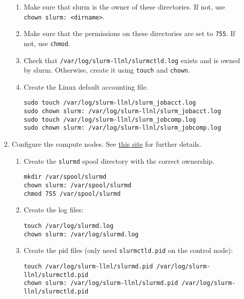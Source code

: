 \begin{enumerate}
\begin{enumerate}
\begin{enumerate}
		\item Make sure that slurm is the owner of these directories. If not, use \texttt{chown slurm: <dirname>}.

		\item Make sure that the permissions on these directories are set to \texttt{755}. If not, use \texttt{chmod}.

		\item Check that \texttt{/var/log/slurm-llnl/slurmctld.log} exists and is owned by slurm. Otherwise, create it using \texttt{touch} and \texttt{chown}.

		\item Create the Linux default accounting file.

			\texttt{sudo touch /var/log/slurm-llnl/slurm\_jobacct.log} \\
			\texttt{sudo chown slurm: /var/log/slurm-llnl/slurm\_jobacct.log } \\
			\texttt{sudo touch /var/log/slurm-llnl/slurm\_jobcomp.log} \\
			\texttt{sudo chown slurm: /var/log/slurm-llnl/slurm\_jobcomp.log}

		\end{enumerate}

	\item Configure the compute nodes. See \href{https://wiki.fysik.dtu.dk/niflheim/Slurm_configuration#id12}{this site} for further details. 

		\begin{enumerate}
		\item Create the \texttt{slurmd} spool directory with the correct ownership.

			\texttt{mkdir /var/spool/slurmd} \\%
			\texttt{chown slurm: /var/spool/slurmd} \\%
			\texttt{chmod 755 /var/spool/slurmd}%

		\item Create the log files:

			\texttt{touch /var/log/slurmd.log} \\
			\texttt{chown slurm: /var/log/slurmd.log}
	
		\item Create the pid files (only need \texttt{slurmctld.pid} on the control node):

			\texttt{touch /var/log/slurm-llnl/slurmd.pid /var/log/slurm-llnl/slurmctld.pid} \\
			\texttt{chown slurm: /var/log/slurm-llnl/slurmd.pid /var/log/slurm-llnl/slurmctld.pid}


\end{enumerate}
\end{enumerate}
\end{enumerate}
